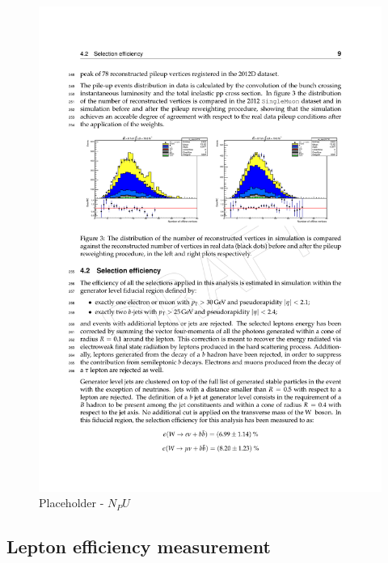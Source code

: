 \begin{figure}[htbp]
	\centering
		\includegraphics[width=\textwidth]{Figures/NPU_placeholder.pdf}
	\caption[Placeholder - PU]{Placeholder - $N_PU$}
	\label{fig:N_pu}
\end{figure} 

\subsection{Lepton efficiency measurement}


